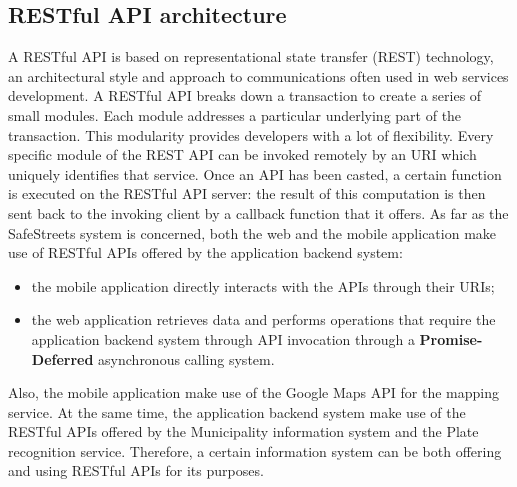 \subsection{RESTful	API architecture}
A RESTful API is based on representational state transfer (REST) technology, an architectural style and approach to communications often used in web services development. A RESTful API breaks down a transaction to create a series of small modules. Each module addresses a particular underlying part of the transaction. This modularity provides developers with a lot of flexibility. Every specific module of the REST API can be invoked remotely by an URI which uniquely identifies that service. Once an API has been casted, a certain function is executed on the RESTful API server: the result of this computation is then sent back to the invoking client by a callback function that it offers.
As far as the SafeStreets system is concerned, both the web and the mobile application make use of RESTful APIs offered by the application backend system: 
\begin{itemize}
    \item the mobile application directly interacts with the APIs through their URIs;
    \item the web application retrieves data and performs operations that require the application backend system through API invocation through a \textbf{Promise-Deferred} asynchronous calling system.
\end{itemize}
Also, the mobile application make use of the Google Maps API for the mapping service.\newline
At the same time, the application backend system make use of the RESTful APIs offered by the Municipality information system and the Plate recognition service.
Therefore, a certain information system can be both offering and using RESTful APIs for its purposes.
